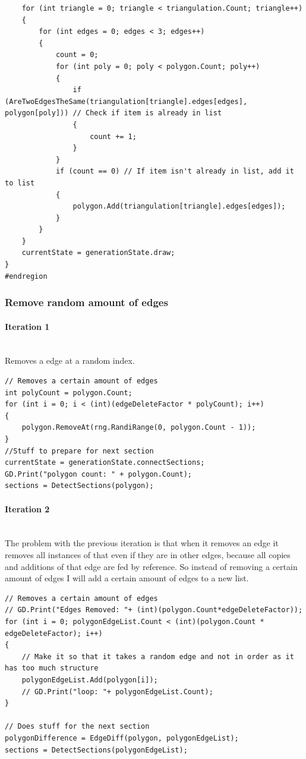 \documentclass{article}
\newcommand{\myparagraph}[1]{\paragraph{#1}\mbox{}\\} %
\begin{document}
\begin{lstlisting}
    for (int triangle = 0; triangle < triangulation.Count; triangle++)
    {
        for (int edges = 0; edges < 3; edges++)
        {
            count = 0;
            for (int poly = 0; poly < polygon.Count; poly++)
            {
                if (AreTwoEdgesTheSame(triangulation[triangle].edges[edges], polygon[poly])) // Check if item is already in list
                {
                    count += 1;
                }
            }
            if (count == 0) // If item isn't already in list, add it to list
            {
                polygon.Add(triangulation[triangle].edges[edges]);
            }
        }
    }
    currentState = generationState.draw;
}
#endregion
\end{lstlisting}

\subsubsection{Remove random amount of edges}
\myparagraph{Iteration 1}
Removes a edge at a random index.
\begin{lstlisting}
// Removes a certain amount of edges
int polyCount = polygon.Count;
for (int i = 0; i < (int)(edgeDeleteFactor * polyCount); i++)
{
    polygon.RemoveAt(rng.RandiRange(0, polygon.Count - 1));
}
//Stuff to prepare for next section
currentState = generationState.connectSections;
GD.Print("polygon count: " + polygon.Count);
sections = DetectSections(polygon);
\end{lstlisting}

\myparagraph{Iteration 2}
The problem with the previous iteration is that when it removes an edge it removes all instances of that even if they are in other edges, because all copies and additions of that edge are fed by reference. So instead of removing a certain amount of edges I will add a certain amount of edges to a new list.
\begin{lstlisting}
// Removes a certain amount of edges
// GD.Print("Edges Removed: "+ (int)(polygon.Count*edgeDeleteFactor));
for (int i = 0; polygonEdgeList.Count < (int)(polygon.Count * edgeDeleteFactor); i++)
{
    // Make it so that it takes a random edge and not in order as it has too much structure
    polygonEdgeList.Add(polygon[i]);
    // GD.Print("loop: "+ polygonEdgeList.Count);
}

// Does stuff for the next section
polygonDifference = EdgeDiff(polygon, polygonEdgeList);
sections = DetectSections(polygonEdgeList);
\end{lstlisting}
\end{document}
